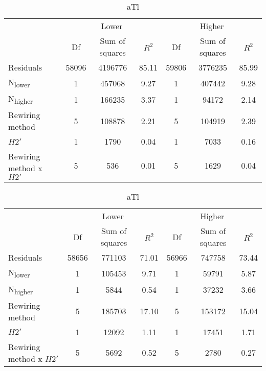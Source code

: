\documentclass[12pt,a4paper]{article}
\begin{document}
\begin{table}[H]
\medskip
\begin{subtable}{\linewidth}
\caption{Atl}
\centering
\begin{tabularx}{\linewidth}{@{} X *6{c} @{}}
\toprule
  & \multicolumn{3}{c}{Lower} & \multicolumn{3}{c}{Higher} \\ \cmidrule(l){2-4} \cmidrule(l){5-7}
  						& Df		& Sum of squares	& $R^2$	& Df 	& Sum of squares	& $R^2$ \\ \midrule
Residuals 				& 58096 & 4196776		& 85.11	& 59806 & 3776235 		& 85.99   \\
N\textsubscript{lower} 	& 1 		& 457068 		& 9.27 	& 1		& 407442		& 9.28  \\
N\textsubscript{higher} 	& 1 		& 166235 			& 3.37	& 1 		& 94172 			& 2.14  \\
Rewiring method 			& 5 		& 108878			& 2.21 	& 5 		& 104919			& 2.39  \\
$H2'$ 					& 1 		& 1790 			& 0.04 	& 1 		& 7033			& 0.16 \\
Rewiring method x $H2'$ 	& 5 		& 536 			& 0.01 	& 5 		& 1629			& 0.04  \\ \bottomrule
\end{tabularx}
\end{subtable}

\medskip
\begin{subtable}{\linewidth}
\caption{aTl}
\centering
\begin{tabularx}{\linewidth}{@{} X *6{c} @{}}
\toprule
  & \multicolumn{3}{c}{Lower} & \multicolumn{3}{c}{Higher} \\ \cmidrule(l){2-4} \cmidrule(l){5-7}
  						& Df		& Sum of squares	& $R^2$	& Df 	& Sum of squares	& $R^2$ \\ \midrule
Residuals 				& 58656 & 771103		& 71.01	& 56966 & 747758		& 73.44   \\
N\textsubscript{lower} 	& 1 		& 105453 		& 9.71 	& 1		& 59791			& 5.87  \\
N\textsubscript{higher} 	& 1 		& 5844 			& 0.54	& 1 		& 37232		& 3.66  \\
Rewiring method 			& 5 		& 185703 		& 17.10 	& 5 		& 153172		& 15.04  \\
$H2'$ 					& 1 		& 12092 			& 1.11 	& 1 		& 17451			& 1.71 \\
Rewiring method x $H2'$ 	& 5 		& 5692 			& 0.52 	& 5 		& 2780			& 0.27  \\ \bottomrule
\end{tabularx}

\end{subtable}
\end{table}
\end{document}
